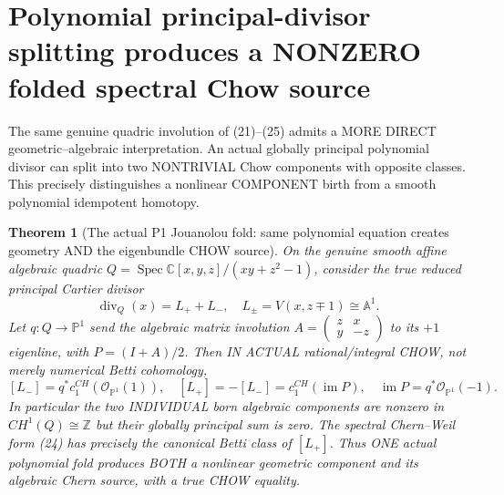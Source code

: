 \documentclass[11pt]{article}
\newtheorem{theorem}{Theorem}[section]
\begin{document}
\section{Polynomial principal-divisor splitting produces a NONZERO folded spectral Chow source}
The same genuine quadric involution of (21)--(25) admits a
MORE DIRECT geometric--algebraic interpretation.
An actual globally principal polynomial divisor can split into
two NONTRIVIAL Chow components with opposite classes.
This precisely distinguishes a nonlinear COMPONENT birth
from a smooth polynomial idempotent homotopy.

\begin{theorem}[The actual P1 Jouanolou fold: same polynomial equation creates geometry AND the eigenbundle CHOW source]
On the genuine smooth affine algebraic quadric
$Q=\operatorname{Spec}\mathbb C[x,y,z]/(xy+z^2-1)$,
consider the true reduced principal Cartier divisor
\[
 \boxed{
 \operatorname{div}_Q(x)=L_++L_-,
 \quad
 L_\pm=V(x,z\mp1)\cong\mathbb A^1 .
 }                                                           \tag{40}
\]
Let $q:Q\to\mathbb P^1$ send the algebraic
matrix involution $A=\begin{pmatrix}z&x\\y&-z\end{pmatrix}$
to its $+1$ eigenline, with
$P=(I+A)/2$.
Then IN ACTUAL rational/integral CHOW,
not merely numerical Betti cohomology,
\[
 \boxed{
 [L_-]=q^*c_1^{CH}(\mathcal O_{\mathbb P^1}(1)),
 \quad [L_+]=-[L_-]
       =c_1^{CH}(\operatorname{im}P),\quad
 \operatorname{im}P=q^*\mathcal O_{\mathbb P^1}(-1).
 }                                                           \tag{41}
\]
In particular the two INDIVIDUAL born algebraic
components are nonzero in $CH^1(Q)\cong\mathbb Z$
but their globally principal sum is zero.
The spectral Chern--Weil form (24) has precisely
the canonical Betti class of $[L_+]$.
Thus ONE actual polynomial fold produces BOTH a
nonlinear geometric component and its algebraic
Chern source, with a true CHOW equality.
\end{theorem}
\end{document}
